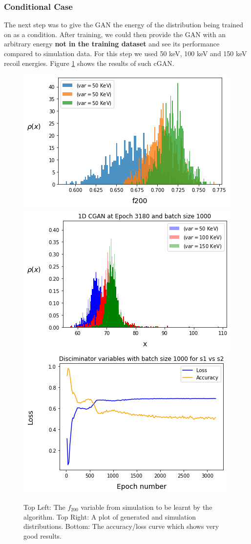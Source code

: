 \documentclass[11pt]{article} %
\begin{document}
\subsubsection{Conditional Case}
The next step was to give the GAN the energy of the distribution being trained on as a condition. After training, we could then provide the GAN with an arbitrary energy \textbf{not in the training dataset} and see its performance compared to simulation data. For this step we used 50 keV, 100 keV and 150 keV recoil energies. Figure \ref{fig:1DcGAN} shows the results of such cGAN.

\begin{figure}[H]
\centering
\includegraphics[scale=0.45]{images/1d_conditional_f200_simulation.png}
\includegraphics[scale=0.45]{images/1d_conditional_f200.png}
\includegraphics[scale=0.45]{images/1d_conditional_loss_f200.png}
\caption{Top Left: The $f_{200}$ variable from simulation to be learnt by the algorithm. Top Right: A plot of generated and simulation distributions. Bottom: The accuracy/loss curve which shows very good results.}
\label{fig:1DcGAN}
\end{figure}
\end{document}
